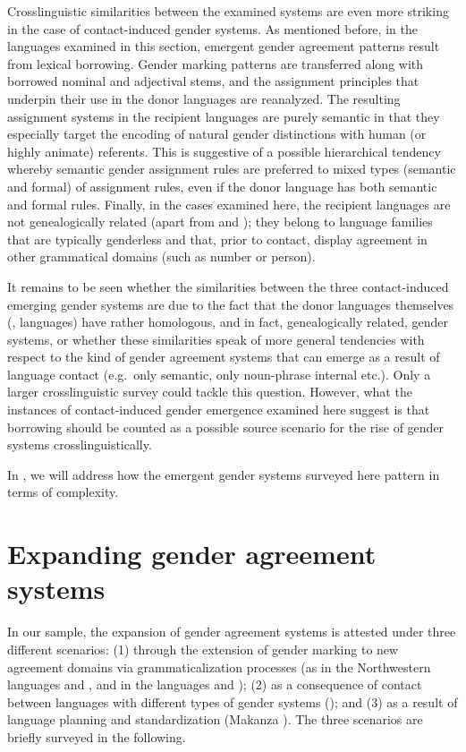 \documentclass[output=collectionpaper]{langsci/langscibook}
\begin{document}
Crosslinguistic similarities between the examined systems are even more striking in the case of contact-induced gender systems. As mentioned before, in the languages examined in this section, emergent gender agreement patterns result from lexical borrowing. Gender marking patterns are transferred along with borrowed nominal and adjectival stems, and the assignment principles that underpin their use in the donor languages are reanalyzed. The resulting assignment systems in the recipient languages are purely semantic in that they especially target the encoding of natural gender distinctions with human (or highly animate) referents. This is suggestive of a possible hierarchical tendency whereby semantic gender assignment rules are preferred to mixed types (semantic and formal) of assignment rules, even if the donor language has both semantic and formal rules. Finally, in the cases examined here, the recipient languages are not genealogically related (apart from  and ); they belong to language families that are typically genderless and that, prior to contact, display agreement in other grammatical domains (such as number or person).

It remains to be seen whether the similarities between the three contact-induced emerging gender systems are due to the fact that the donor languages themselves (,  languages) have rather homologous, and in fact, genealogically related, gender systems, or whether these similarities speak of more general tendencies with respect to the kind of gender agreement systems that can emerge as a result of language contact (e.g.\ only semantic, only noun-phrase internal etc.). Only a larger crosslinguistic survey could tackle this question. However, what the instances of contact-induced gender emergence examined here suggest is that borrowing should be counted as a possible source scenario for the rise of gender systems crosslinguistically.


In , we will address how the emergent gender systems surveyed here pattern in terms of complexity.

\section{Expanding gender agreement systems}
\label{subsec:expanding}
In our sample, the expansion of gender agreement systems is attested under three different scenarios: (1) through the extension of gender marking to new agreement domains via grammaticalization processes  (as in the Northwestern  languages  and , and in the  languages  and ); (2) as a consequence of contact between languages with different types of gender systems (); and (3) as a result of language planning and standardization (Makanza ). The three scenarios are briefly surveyed in the following.
\end{document}
